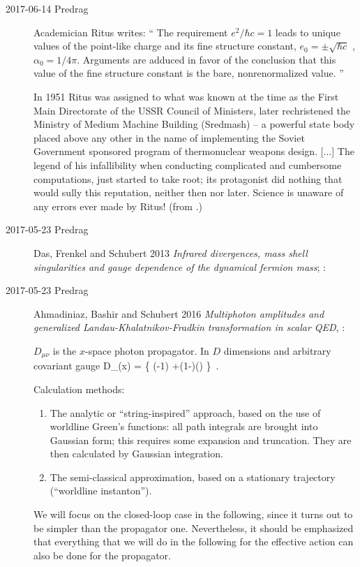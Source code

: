 \begin{description}
\item[2017-06-14 Predrag]
Academician Ritus writes: ``
The requirement  {$ e^{2}/\hbar c = 1$} leads to unique values of the
point-like charge and its fine structure constant, {$ e_{0} = \pm
\sqrt{\hbar c}$} , {$ \alpha_{0} = 1/4 \pi$}. Arguments are adduced in
favor of the conclusion that this value of the fine structure constant is
the bare, nonrenormalized value.
''

In 1951 Ritus was assigned to what was known at the time as the First Main
Directorate of the USSR Council of Ministers, later rechristened the
Ministry of Medium Machine Building (Sredmash) -- a powerful state body
placed above any other in the name of implementing the Soviet Government
sponsored program of thermonuclear weapons design. [...]
The legend of his infallibility when conducting complicated and
cumbersome computations, just started to take root; its protagonist did
nothing that would sully this reputation, neither then nor later. Science
is unaware of any errors ever made by Ritus! (from .)

\item[2017-05-23 Predrag]

Das, Frenkel and Schubert 2013
{\em Infrared divergences, mass shell singularities and gauge dependence
of the dynamical fermion mass};
 :

\item[2017-05-23 Predrag]
Ahmadiniaz, Bashir and Schubert 2016
{\em Multiphoton amplitudes and generalized {Landau-Khalatnikov-Fradkin}
transformation in scalar {QED}},  	:

$D_{\mu\nu} $ is the $x$-space photon
propagator. In $D$ dimensions and arbitrary covariant gauge
\beq
D_{\mu\nu}(x) =
\Big\{
\Gamma\Big(-1\Big)
    +(1-\xi)\Gamma\Big(\Big)
\Big\}
\,.

Calculation methods:
\begin{enumerate}
  \item
The analytic or ``string-inspired'' approach, based on the use of
worldline Green's functions: all path integrals are brought into Gaussian
form; this requires some expansion and truncation. They are then
calculated by Gaussian integration.
  \item
The semi-classical approximation, based on a stationary trajectory
(``worldline instanton'').
\end{enumerate}
We will focus on the closed-loop case in the following, since it turns out to
be simpler than the propagator one. Nevertheless, it should be emphasized
that everything that we will do in the following for the effective action can
also be done for the propagator.


\end{description}

